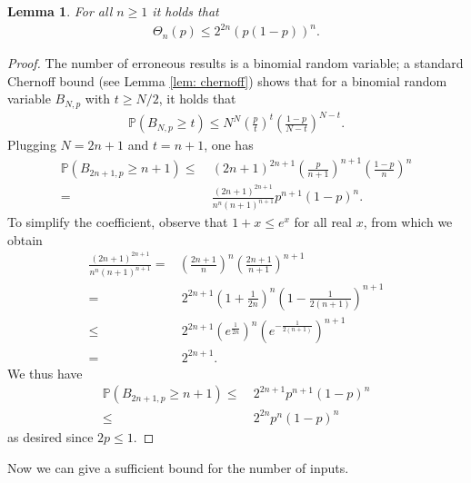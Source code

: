 \documentclass[12pt,reqno]{amsart}
\theoremstyle{plain} %
\newtheorem{lemma}[theorem]{Lemma}
\theoremstyle{remark}
\theoremstyle{definition}
\renewcommand{\P}{\mathbb P}
\begin{document}
\begin{lemma}\label{lem: thetabound}
        For all $n\ge1$ it holds that
        \begin{align}
            \Theta_n(p)\le 2^{2n}(p(1-p))^n.
        \end{align}
    \end{lemma}
    \begin{proof}
       The number of erroneous results is a binomial random variable; a standard Chernoff bound (see Lemma \ref{lem: chernoff}) shows that for a binomial random variable $B_{N,p}$ with $t\ge N/2$, it holds that
    \begin{align}
        \P(B_{N,p}\ge t)\le N^N\left(\frac{p}{t}\right)^t\left(\frac{1-p}{N-t}\right)^{N-t}.
    \end{align}
    Plugging $N=2n+1$ and $t=n+1$, one has
    \begin{align}
        \P(B_{2n+1,p}\ge n+1)\le&\  (2n+1)^{2n+1}\left(\frac{p}{n+1}\right)^{n+1}\left(\frac{1-p}{n}\right)^{n}\\
        =&\ \frac{(2n+1)^{2n+1}}{n^n(n+1)^{n+1}}p^{n+1}(1-p)^n.
    \end{align}
    To simplify the coefficient, observe that $1+x\le e^x$ for all real $x$, from which we obtain
        \begin{align}
    \frac{(2n+1)^{2n+1}}{n^n(n+1)^{n+1}}=&\left(\frac{2n+1}{n}\right)^n\left(\frac{2n+1}{n+1}\right)^{n+1}\\
    =&\ 2^{2n+1}\left(1+\frac{1}{2n}\right)^n\left(1-\frac{1}{2(n+1)}\right)^{n+1}\\
    \le&\ 2^{2n+1}\left(e^{\frac{1}{2n}}\right)^n\left(e^{-\frac{1}{2(n+1)}}\right)^{n+1}\\
    =&\ 2^{2n+1}.
        \end{align}
    We thus have
    \begin{align}
        \P(B_{2n+1,p}\ge n+1)\le&\ 2^{2n+1}p^{n+1}(1-p)^n\\
        \le&\ 2^{2n}p^n(1-p)^n
    \end{align}
    as desired since $2p\le 1$.
    \end{proof}

    Now we can give a sufficient bound for the number of inputs.
    
\end{document}

